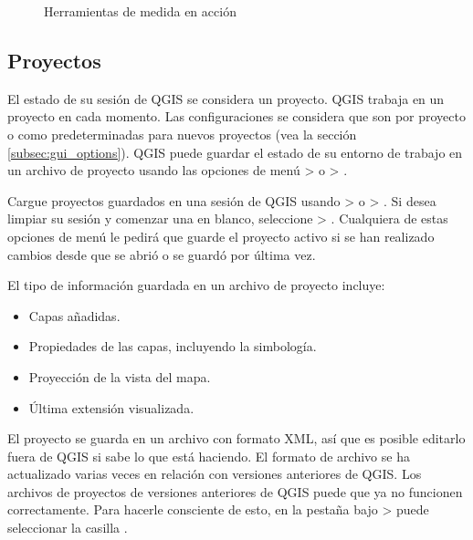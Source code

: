 \begin{figure}[h]
\caption{Herramientas de medida en acción \nixcaption} \label{fig:measure}
\centering
   \goodgap
\end{figure}

\subsection{Proyectos}\label{sec:projects}

El estado de su sesión de QGIS se considera un proyecto. QGIS
trabaja en un proyecto en cada momento. Las configuraciones se considera que son
por proyecto o como predeterminadas para nuevos proyectos (vea 
la sección \ref{subsec:gui_options}). QGIS puede guardar el estado de su entorno de trabajo
en un archivo de proyecto usando las opciones de menú 
 > 
o  > .

Cargue proyectos guardados en una sesión de QGIS usando 
 > 
o  > .
Si desea limpiar su sesión y comenzar una en blanco, seleccione
 > .
Cualquiera de estas opciones de menú le pedirá que guarde el proyecto activo si se han
realizado cambios desde que se abrió o se guardó por última vez.

El tipo de información guardada en un archivo de proyecto incluye:

\begin{itemize}
\item Capas añadidas.
\item Propiedades de las capas, incluyendo la simbología.
\item Proyección de la vista del mapa.
\item Última extensión visualizada.
\end{itemize}

El proyecto se guarda en un archivo con formato XML, así que es posible editarlo
fuera de QGIS si sabe lo que está haciendo. El formato de archivo se ha actualizado
varias veces en relación con versiones anteriores de QGIS. Los archivos de proyectos 
de versiones anteriores de QGIS puede que ya no funcionen correctamente. Para hacerle
consciente de esto, en la pestaña  bajo  >  
puede seleccionar la casilla .

